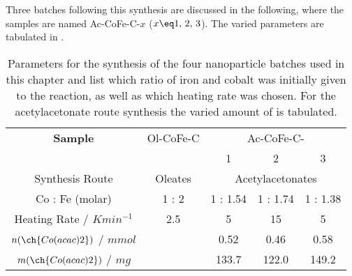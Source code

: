 \documentclass[\main/dresen_thesis.tex]{subfiles}
\begin{document}
    Three batches following this synthesis are discussed in the following, where the samples are named Ac-CoFe-C-$x$ ($x \eq 1,\, 2,\, 3$). The varied parameters are tabulated in .



    \begin{table}[htbp]
      \centering
      \caption{\label{tab:monolayers:synthesis:nanoparticles}Parameters for the synthesis of the four nanoparticle batches used in this chapter and list which ratio of iron and cobalt was initially given to the reaction, as well as which heating rate was chosen. For the acetylacetonate route synthesis the varied amount of  is tabulated.}
      \begin{tabular}{ c || c || c | c | c }
        \textbf{Sample} & Ol-CoFe-C & \multicolumn{3}{c}{Ac-CoFe-C-}\\
                        &           & 1 & 2 & 3 \\
        \hline
        \rule{0pt}{2ex} Synthesis Route                       & Oleates & \multicolumn{3}{c}{Acetylacetonates}\\
        \hline
        \rule{0pt}{2ex} Co : Fe (molar)                       & 1 : 2   & 1 : 1.54 & 1 : 1.74 & 1 : 1.38 \\
        \hline
        \rule{0pt}{2ex} Heating Rate / $\unit{K min^{-1}}$    & 2.5     & 5        & 15       & 5 \\
        \hline
        \rule{0pt}{2ex} $n(\ch{Co(acac)2})$ / $\unit{mmol}$   &         & 0.52     & 0.46      & 0.58  \\
        \rule{0pt}{2ex} $m(\ch{Co(acac)2})$ / $\unit{mg}$     &         & 133.7    & 122.0     & 149.2 \\
        \hline
      \end{tabular}
    \end{table}
\end{document}

